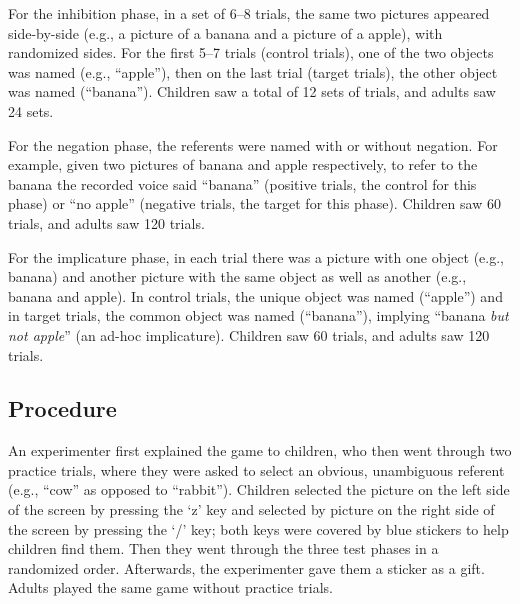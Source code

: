 \documentclass[10pt,letterpaper]{article}
\begin{document}
For the inhibition phase, in a set of 6--8 trials, the same two pictures appeared side-by-side (e.g., a picture of a banana and a picture of a apple), with randomized sides. For the first 5--7 trials (control trials), one of the two objects was named (e.g., ``apple''), then on the last trial (target trials), the other object was named (``banana'').
Children saw a total of 12 sets of trials, and adults saw 24 sets.

For the negation phase, the referents were named with or without negation. For example, given two pictures of banana and apple respectively, to refer to the banana the recorded voice said ``banana'' (positive trials, the control for this phase) or ``no apple'' (negative trials, the target for this phase). Children saw 60 trials, and adults saw 120 trials.

For the implicature phase, in each trial there was a picture with one object (e.g., banana) and another picture with the same object as well as another (e.g., banana and apple). In control trials, the unique object was named (``apple'') and in target trials, the common object was named (``banana''), implying ``banana \emph{but not apple}'' (an ad-hoc implicature). Children saw 60 trials, and adults saw 120 trials.

\subsection{Procedure}

An experimenter first explained the game to children, who then went through two practice trials, where they were asked to select an obvious, unambiguous referent (e.g., ``cow'' as opposed to ``rabbit''). Children selected the picture on the left side of the screen by pressing the `z' key and selected by picture on the right side of the screen by pressing the `/' key; both keys were covered by blue stickers to help children find them. Then they went through the three test phases in a randomized order. Afterwards, the experimenter gave them a sticker as a gift. Adults played the same game without practice trials.
\end{document}
